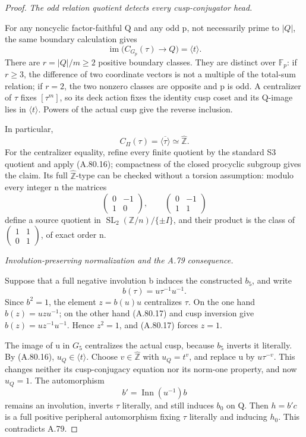 \begin{proof}
\emph{The odd relation quotient detects every cusp-conjugator head.}\par
For any noncyclic factor-faithful Q and any odd p, not
necessarily prime to \(|Q|\), the same boundary calculation
gives
\[
          \operatorname{im}\bigl(C_{G_p}(\tau)\to Q\bigr)
                        =\langle t\rangle.
 \tag{A.80.16}
\]
There are \(r=|Q|/m\geq2\) positive boundary classes.
They are distinct over \(\mathbb F_p\): if \(r\geq3\),
the difference of two coordinate vectors is not a multiple
of the total-sum relation; if \(r=2\), the two nonzero
classes are opposite and p is odd. A centralizer of
\(\tau\) fixes \([\tau^m]\), so its deck action fixes
the identity cusp coset and its Q-image lies in
\(\langle t\rangle\). Powers of the actual cusp give
the reverse inclusion.

In particular,
\[
                   C_\Pi(\tau)=\overline{\langle\tau\rangle}
                              \simeq\widehat{\mathbb Z}.
 \tag{A.80.17}
\]
For the centralizer equality, refine every finite quotient
by the standard S3 quotient and apply (A.80.16);
compactness of the closed procyclic subgroup gives the
claim. Its full \(\widehat{\mathbb Z}\)-type can be
checked without a torsion assumption: modulo every integer
n the matrices
\[
 \begin{pmatrix}0&-1\\1&0\end{pmatrix},\qquad
 \begin{pmatrix}0&-1\\1&1\end{pmatrix}
\]
define a source quotient in
\(\operatorname{SL}_2(\mathbb Z/n)/\{\pm I\}\), and
their product is the class of
\(\left(\begin{smallmatrix}1&1\\0&1\end{smallmatrix}\right)\),
of exact order n.

\emph{Involution-preserving normalization and the A.79 consequence.}\par
Suppose that a full negative involution b induces the
constructed \(b_5\), and write
\[
                        b(\tau)=u\tau^{-1}u^{-1}.
\]
Since \(b^2=1\), the element \(z=b(u)u\) centralizes
\(\tau\). On the one hand \(b(z)=u z u^{-1}\);
on the other hand (A.80.17) and cusp inversion give
\(b(z)=u z^{-1}u^{-1}\). Hence \(z^2=1\), and
(A.80.17) forces \(z=1\).

The image of u in \(G_5\) centralizes the actual cusp,
because \(b_5\) inverts it literally. By (A.80.16),
\(u_Q\in\langle t\rangle\). Choose
\(v\in\widehat{\mathbb Z}\) with \(u_Q=t^v\), and
replace u by \(u\tau^{-v}\). This changes neither its
cusp-conjugacy equation nor its norm-one property, and now
\(u_Q=1\). The automorphism
\[
                           b'=\operatorname{Inn}(u^{-1})b
 \tag{A.80.18}
\]
remains an involution, inverts \(\tau\) literally, and
still induces \(b_0\) on Q. Then \(h=b'c\) is a full
positive peripheral automorphism fixing \(\tau\) literally
and inducing \(h_0\). This contradicts A.79.


\end{proof}
